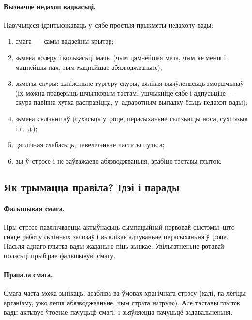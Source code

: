 \paragraph{Вызначце недахоп вадкасьці.} Навучыцеся ідэнтыфікаваць у~сябе простыя прыкметы недахопу вады:
\begin{enumerate}
  \item смага~--- самы надзейны крытэр;
  \item зьмена колеру і колькасьці мачы (чым цямнейшая мача, чым яе менш і мацнейшы пах, тым мацнейшае абязводжваньне);
  \item зьмены скуры: зьніжэньне тургору скуры, вялікая выяўленасьць зморшчынаў (іх можна праверыць шчыпковым тэстам: ушчыкніце сябе і адпусьціце~--- скура павінна хутка расправіцца, у~адваротным выпадку ёсьць недахоп вады);
  \item зьмена сьлізьніцаў (сухасьць у~роце, перасыханьне сьлізьніцы носа, сухі язык і г.~д.);
  \item цяглічная слабасьць, павелічэньне частаты пульса;
  \item вы ў~стрэсе і не заўважаеце абязводжваньня, зрабіце тэставы глыток.
\end{enumerate}

\subsection{Як трымацца правіла? Ідэі і парады}

\paragraph{Фальшывая смага.}
Пры стрэсе павялічваецца актыўнасьць сымпацыйнай нэрвовай сыстэмы, што гняце работу сьлінных залозаў і выклікае адчуваньне перасыханьня ў~роце. Пасьля аднаго глытка вады жаданьне піць зьнікае. Увільгатненьне ротавай поласьці прыбірае фальшывую смагу.


\paragraph{Прапала смага.}
Смага часта можа зьнікаць, асабліва ва ўмовах хранічнага стрэсу (калі, па лёгіцы арганізму, ужо лепш абязводжваньне, чым страта натрыю). Але тэставы глыток вады актывуе ўтоенае пачуцьцё смагі, і зьяўляецца пачуцьцё задавальненьня.

